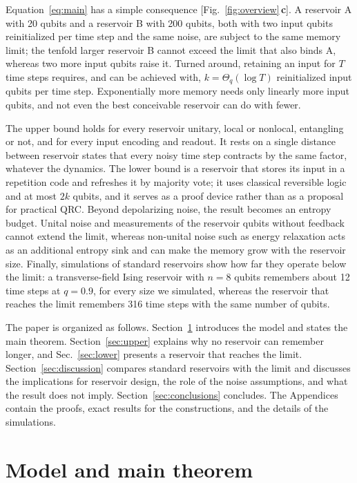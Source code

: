 \documentclass[aps,pra,reprint,superscriptaddress,floatfix]{revtex4-2}
\theoremstyle{plain}
\newcommand{\pnl}[1]{\textsf{\textbf{#1}}}
\begin{document}
Equation~\eqref{eq:main} has a simple consequence [Fig.~\ref{fig:overview}\,\pnl{c}]. A reservoir A with 20 qubits and a reservoir B with 200 qubits, both with two input qubits reinitialized per time step and the same noise, are subject to the same memory limit; the tenfold larger reservoir B cannot exceed the limit that also binds A, whereas two more input qubits raise it. Turned around, retaining an input for $T$ time steps requires, and can be achieved with, $k=\Theta_q(\log T)$ reinitialized input qubits per time step. Exponentially more memory needs only linearly more input qubits, and not even the best conceivable reservoir can do with fewer.

The upper bound holds for every reservoir unitary, local or nonlocal, entangling or not, and for every input encoding and readout. It rests on a single distance between reservoir states that every noisy time step contracts by the same factor, whatever the dynamics. The lower bound is a reservoir that stores its input in a repetition code and refreshes it by majority vote; it uses classical reversible logic and at most $2k$ qubits, and it serves as a proof device rather than as a proposal for practical QRC. Beyond depolarizing noise, the result becomes an entropy budget. Unital noise and measurements of the reservoir qubits without feedback cannot extend the limit, whereas non-unital noise such as energy relaxation acts as an additional entropy sink and can make the memory grow with the reservoir size. Finally, simulations of standard reservoirs show how far they operate below the limit: a transverse-field Ising reservoir with $n=8$ qubits remembers about 12 time steps at $q=0.9$, for every size we simulated, whereas the reservoir that reaches the limit remembers 316 time steps with the same number of qubits.

The paper is organized as follows. Section~\ref{sec:model} introduces the model and states the main theorem. Section~\ref{sec:upper} explains why no reservoir can remember longer, and Sec.~\ref{sec:lower} presents a reservoir that reaches the limit. Section~\ref{sec:discussion} compares standard reservoirs with the limit and discusses the implications for reservoir design, the role of the noise assumptions, and what the result does not imply. Section~\ref{sec:conclusions} concludes. The Appendices contain the proofs, exact results for the constructions, and the details of the simulations.

\section{Model and main theorem}
\label{sec:model}
\end{document}
